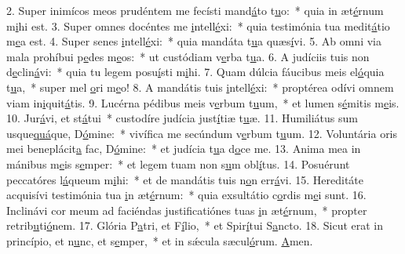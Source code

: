 2. Super inimícos meos prudéntem me fecísti mand\uline{á}to t\uline{u}o:~* quia in æt\uline{é}rnum m\uline{i}hi est.
3. Super omnes docéntes me \uline{i}ntell\uline{é}xi:~* quia testimónia tua medit\uline{á}tio m\uline{e}a est.
4. Super senes \uline{i}ntell\uline{é}xi:~* quia mandáta t\uline{u}a quæs\uline{í}vi.
5. Ab omni via mala prohíbui p\uline{e}des m\uline{e}os:~* ut custódiam v\uline{e}rba t\uline{u}a.
6. A judíciis tuis non d\uline{e}clin\uline{á}vi:~* quia tu legem posu\uline{í}sti m\uline{i}hi.
7. Quam dúlcia fáucibus meis el\uline{ó}quia t\uline{u}a,~* super mel \uline{o}ri m\uline{e}o!
8. A mandátis tuis \uline{i}ntell\uline{é}xi:~* proptérea odívi omnem viam in\uline{i}quit\uline{á}tis.
9. Lucérna pédibus meis v\uline{e}rbum t\uline{u}um,~* et lumen s\uline{é}mitis m\uline{e}is.
10. Jur\uline{á}vi, et st\uline{á}tui~* custodíre judícia just\uline{í}tiæ t\uline{u}æ.
11. Humiliátus sum usque\uline{quá}que, D\uline{ó}mine:~* vivífica me secúndum v\uline{e}rbum t\uline{u}um.
12. Voluntária oris mei beneplácit\uline{a} fac, D\uline{ó}mine:~* et judícia t\uline{u}a d\uline{o}ce me.
13. Anima mea in mánibus m\uline{e}is s\uline{e}mper:~* et legem tuam non s\uline{u}m obl\uline{í}tus.
14. Posuérunt peccatóres l\uline{á}queum m\uline{i}hi:~* et de mandátis tuis n\uline{o}n err\uline{á}vi.
15. Hereditáte acquisívi testimónia tua \uline{i}n æt\uline{é}rnum:~* quia exsultátio c\uline{o}rdis m\uline{e}i sunt.
16. Inclinávi cor meum ad faciéndas justificatiónes tuas \uline{i}n æt\uline{é}rnum,~* propter retrib\uline{u}ti\uline{ó}nem.
17. Glória P\uline{a}tri, et F\uline{í}lio,~* et Spir\uline{í}tui S\uline{a}ncto.
18. Sicut erat in princípio, et n\uline{u}nc, et s\uline{e}mper,~* et in sǽcula sæcul\uline{ó}rum. \uline{A}men.
